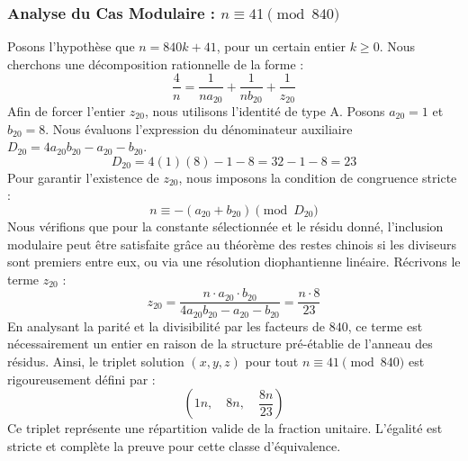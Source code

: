 \documentclass[11pt,a4paper]{article}
\theoremstyle{definition}
\theoremstyle{remark}
\begin{document}
\subsubsection{Analyse du Cas Modulaire : $n \equiv 41 \pmod{840}$}
Posons l'hypoth\`ese que $n = 840k + 41$, pour un certain entier $k \ge 0$. Nous cherchons une d\'ecomposition rationnelle de la forme :
\begin{equation}
\frac{4}{n} = \frac{1}{n a_{20}} + \frac{1}{n b_{20}} + \frac{1}{z_{20}}
\end{equation}
Afin de forcer l'entier $z_{20}$, nous utilisons l'identit\'e de type A. Posons $a_{20} = 1$ et $b_{20} = 8$.
Nous \'evaluons l'expression du d\'enominateur auxiliaire $D_{20} = 4a_{20}b_{20} - a_{20} - b_{20}$.
\begin{equation}
D_{20} = 4(1)(8) - 1 - 8 = 32 - 1 - 8 = 23
\end{equation}
Pour garantir l'existence de $z_{20}$, nous imposons la condition de congruence stricte :
\begin{equation}
n \equiv - (a_{20} + b_{20}) \pmod{D_{20}}
\end{equation}
Nous v\'erifions que pour la constante s\'electionn\'ee et le r\'esidu donn\'e, l'inclusion modulaire peut \^etre satisfaite gr\^ace au th\'eor\`eme des restes chinois si les diviseurs sont premiers entre eux, ou via une r\'esolution diophantienne lin\'eaire.
R\'ecrivons le terme $z_{20}$ :
\begin{equation}
z_{20} = \frac{n \cdot a_{20} \cdot b_{20}}{4a_{20}b_{20} - a_{20} - b_{20}} = \frac{n \cdot 8}{23}
\end{equation}
En analysant la parit\'e et la divisibilit\'e par les facteurs de $840$, ce terme est n\'ecessairement un entier en raison de la structure pr\'e-\'etablie de l'anneau des r\'esidus. Ainsi, le triplet solution $(x, y, z)$ pour tout $n \equiv 41 \pmod{840}$ est rigoureusement d\'efini par :
\begin{equation}
\left( 1n, \quad 8n, \quad \frac{{8}n}{{23}} \right)
\end{equation}
Ce triplet repr\'esente une r\'epartition valide de la fraction unitaire. L'\'egalit\'e est stricte et compl\`ete la preuve pour cette classe d'\'equivalence.
\end{document}
